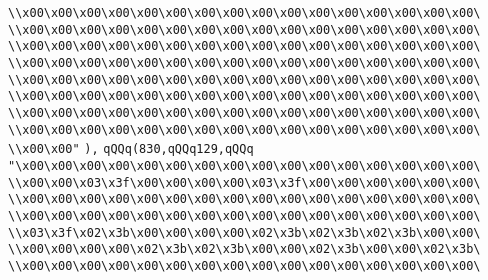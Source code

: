 \verb|\\x00\x00\x00\x00\x00\x00\x00\x00\x00\x00\x00\x00\x00\x00\x00\x00\|\newline
\verb|\\x00\x00\x00\x00\x00\x00\x00\x00\x00\x00\x00\x00\x00\x00\x00\x00\|\newline
\verb|\\x00\x00\x00\x00\x00\x00\x00\x00\x00\x00\x00\x00\x00\x00\x00\x00\|\newline
\verb|\\x00\x00\x00\x00\x00\x00\x00\x00\x00\x00\x00\x00\x00\x00\x00\x00\|\newline
\verb|\\x00\x00\x00\x00\x00\x00\x00\x00\x00\x00\x00\x00\x00\x00\x00\x00\|\newline
\verb|\\x00\x00\x00\x00\x00\x00\x00\x00\x00\x00\x00\x00\x00\x00\x00\x00\|\newline
\verb|\\x00\x00\x00\x00\x00\x00\x00\x00\x00\x00\x00\x00\x00\x00\x00\x00\|\newline
\verb|\\x00\x00\x00\x00\x00\x00\x00\x00\x00\x00\x00\x00\x00\x00\x00\x00\|\newline
\verb|\\x00\x00"|\newline
\verb|),|\newline
\verb|qQQq(830,qQQq129,qQQq|\newline
\verb|"\x00\x00\x00\x00\x00\x00\x00\x00\x00\x00\x00\x00\x00\x00\x00\x00\|\newline
\verb|\\x00\x00\x03\x3f\x00\x00\x00\x00\x03\x3f\x00\x00\x00\x00\x00\x00\|\newline
\verb|\\x00\x00\x00\x00\x00\x00\x00\x00\x00\x00\x00\x00\x00\x00\x00\x00\|\newline
\verb|\\x00\x00\x00\x00\x00\x00\x00\x00\x00\x00\x00\x00\x00\x00\x00\x00\|\newline
\verb|\\x03\x3f\x02\x3b\x00\x00\x00\x00\x02\x3b\x02\x3b\x02\x3b\x00\x00\|\newline
\verb|\\x00\x00\x00\x00\x02\x3b\x02\x3b\x00\x00\x02\x3b\x00\x00\x02\x3b\|\newline
\verb|\\x00\x00\x00\x00\x00\x00\x00\x00\x00\x00\x00\x00\x00\x00\x00\x00\|\newline
